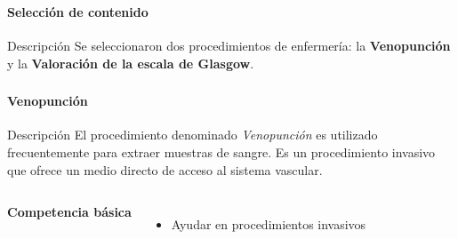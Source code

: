 \begin{frame}
\frametitle{\pagetitle}
\framesubtitle{Selección de contenido}

\begin{block}{Descripción}
\centering
Se seleccionaron dos procedimientos de enfermería: la \textbf{Venopunción} y 
la \textbf{Valoración de la escala de Glasgow}.
\end{block}

\end{frame}


\begin{frame}
    \frametitle{\pagetitle}
    \framesubtitle{Venopunción}

    
    \begin{block}{Descripción}
    \centering
    El procedimiento denominado \emph{Venopunción} es utilizado
    frecuentemente para extraer muestras de sangre. Es un procedimiento invasivo
    que ofrece un medio directo de acceso al sistema vascular. 
    \end{block}

	\begin{columns}
	 \hspace{0.5cm}
    \centering
    
     \hspace{0.5cm}
    \textbf{Competencia básica}
    \begin{itemize}
	\item Ayudar en procedimientos invasivos
	\end{itemize}
	\end{columns}

\end{frame}

